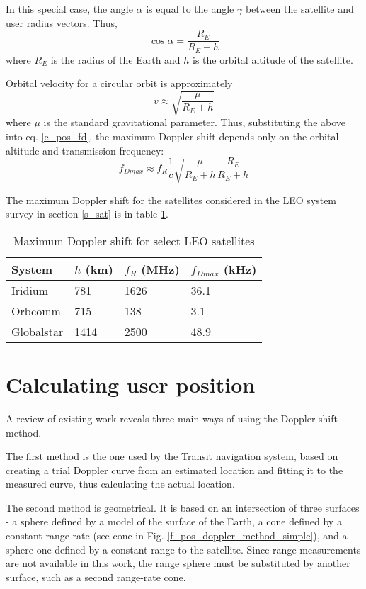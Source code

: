 In this special case, the angle $\alpha$ is equal to the angle $\gamma$ between the satellite and user radius vectors. Thus,
\begin{equation*}
    \cos{\alpha} = \frac{R_E}{R_E + h}
\end{equation*}
where $R_E$ is the radius of the Earth and $h$ is the orbital altitude of the satellite.

Orbital velocity for a circular orbit is approximately
\begin{equation*}
    v \approx \sqrt{\frac{\mu}{R_E + h}}
\end{equation*}
where $\mu$ is the standard gravitational parameter. Thus, substituting the above into eq. \ref{e_pos_fd}, the maximum Doppler shift depends only on the orbital altitude and transmission frequency:
\begin{equation}
    \label{e_pos_fd_max}
    f_{D max} \approx f_R \frac{1}{c} \sqrt{\frac{\mu}{R_E + h}} \frac{R_E}{R_E + h}
\end{equation}

The maximum Doppler shift for the satellites considered in the LEO system survey in section \ref{s_sat} is in table \ref{t_pos_max_fd}.

\begin{table}
    \centering
    \begin{tabular}{llll}
    System     & $h$ (km) &  $f_R$ (MHz) & $f_{Dmax}$ (kHz) \\ \hline
    Iridium    &  781  &  1626 & \num{36.1} \\
    Orbcomm    &  715  &  138  & \num{3.1} \\
    Globalstar &  1414 &  2500 & \num{48.9}
    \end{tabular}
    \caption{Maximum Doppler shift for select LEO satellites}
    \label{t_pos_max_fd}
\end{table}

\section{Calculating user position}
A review of existing work reveals three main ways of using the Doppler shift method.

The first method is the one used by the Transit navigation system, based on creating a trial Doppler curve from an estimated location and fitting it to the measured curve, thus calculating the actual location\cite{sat16}.

The second method is geometrical. It is based on an intersection of three surfaces - a sphere defined by a model of the surface of the Earth, a cone defined by a constant range rate (see cone in Fig. \ref{f_pos_doppler_method_simple}), and a sphere one defined by a constant range to the satellite\cite{sop22}. Since range measurements are not available in this work, the range sphere must be substituted by another surface, such as a second range-rate cone.

